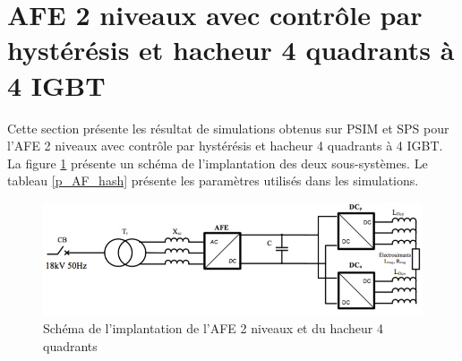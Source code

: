\documentclass[11pt,letterpaper,final]{report}
\begin{document}
\section{AFE 2 niveaux avec contrôle par hystérésis et hacheur 4 quadrants à 4 IGBT}
Cette section présente les résultat de simulations obtenus sur PSIM et SPS pour l'AFE 2 niveaux avec contrôle par hystérésis et hacheur 4 quadrants à 4 IGBT. La figure \ref{AF_DC} présente un schéma de l'implantation des deux sous-systèmes. Le tableau \ref{p_AF_hash} présente les paramètres utilisés dans les simulations.
\begin{figure}[htb]
\centering
\includegraphics[scale=0.5]{Fig/Hach_AFE/AFE.jpg}
\caption{Schéma de l'implantation de l'AFE 2 niveaux et du hacheur 4 quadrants}
\label{AF_DC}
\end{figure}
\end{document}
